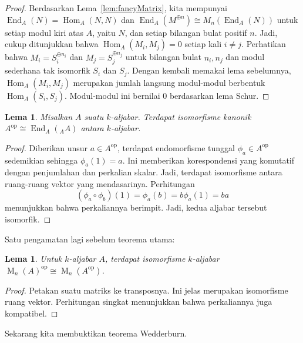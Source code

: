 \documentclass[12pt]{article}
\theoremstyle{plain}
\newtheorem{lemma}[theorem]{Lema}
\theoremstyle{definition}
\theoremstyle{remark}
\numberwithin{equation}{section}
\begin{document}
\begin{proof}
Berdasarkan Lema~\ref{lem:fancyMatrix},
kita mempunyai $\operatorname{End}_A(N) = \operatorname{Hom}_A(N,N)$ dan
$\operatorname{End}_A(M^{\oplus n}) \cong M_n(\operatorname{End}_A(N))$
untuk setiap modul kiri atas $A$, yaitu $N$, dan setiap bilangan bulat positif $n$.
Jadi, cukup
ditunjukkan bahwa $\operatorname{Hom}_A(M_i,M_j)=0$ setiap kali $i \ne j$.
Perhatikan bahwa $M_i=S_i^{\oplus n_i}$ dan $M_j=S_j^{\oplus n_j}$
untuk bilangan bulat $n_i, n_j$ dan
modul sederhana tak isomorfik $S_i$ dan $S_j$.
Dengan kembali memakai lema sebelumnya, $\operatorname{Hom}_A(M_i,M_j)$ merupakan jumlah langsung
modul-modul berbentuk $\operatorname{Hom}_A(S_i,S_j)$. Modul-modul ini bernilai $0$ berdasarkan lema Schur.
\end{proof}

\begin{lemma}
Misalkan $A$ suatu $k$-aljabar.
Terdapat isomorfisme kanonik $A^{\mathrm{op}} \cong \operatorname{End}_A({}_AA)$ antara
$k$-aljabar.
\end{lemma}

\begin{proof}
Diberikan unsur $a \in A^{\mathrm{op}}$,
terdapat endomorfisme tunggal $\phi_a \in A^{\mathrm{op}}$
sedemikian sehingga $\phi_a(1)=a$.
Ini memberikan korespondensi yang komutatif dengan penjumlahan dan
perkalian skalar.
Jadi, terdapat isomorfisme antara ruang-ruang vektor yang mendasarinya.
Perhitungan
\[ (\phi_a \circ \phi_b)(1)=\phi_a(b)=b\phi_a(1)=ba \]
menunjukkan bahwa perkaliannya berimpit.
Jadi, kedua aljabar tersebut isomorfik.
\end{proof}

Satu pengamatan lagi sebelum teorema utama:

\begin{lemma}
Untuk $k$-aljabar $A$, terdapat
isomorfisme $k$-aljabar $\operatorname{M}_n(A)^{\mathrm{op}}
\cong \operatorname{M}_n(A^{\mathrm{op}})$.
\end{lemma}

\begin{proof}
Petakan suatu matriks ke transposnya. Ini jelas merupakan
isomorfisme ruang vektor. Perhitungan singkat menunjukkan bahwa perkaliannya
juga kompatibel. 
\end{proof}

Sekarang kita membuktikan teorema Wedderburn.
\end{document}
